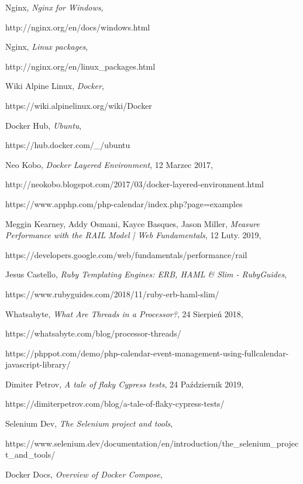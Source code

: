 \begin{thebibliography}{99}
Nginx,
\textit{Nginx for Windows},

http://nginx.org/en/docs/windows.html

Nginx, 
\textit{Linux packages},

http://nginx.org/en/linux\_packages.html

Wiki Alpine Linux, 
\textit{Docker},

https://wiki.alpinelinux.org/wiki/Docker

Docker Hub,
\textit{Ubuntu},

https://hub.docker.com/\_/ubuntu

Neo Kobo,
\textit{Docker Layered Environment},
12 Marzec 2017,

http://neokobo.blogspot.com/2017/03/docker-layered-environment.html

https://www.apphp.com/php-calendar/index.php?page=examples

Meggin Kearney, Addy Osmani, Kayce Basques, Jason Miller,
\textit{Measure Performance with the RAIL Model | Web Fundamentals},
12 Luty. 2019,

https://developers.google.com/web/fundamentals/performance/rail

Jesus Castello, 
\textit{Ruby Templating Engines: ERB, HAML \& Slim - RubyGuides},

https://www.rubyguides.com/2018/11/ruby-erb-haml-slim/

Whatsabyte,
\textit{What Are Threads in a Processor?},
24 Sierpień 2018,

https://whatsabyte.com/blog/processor-threads/

https://phppot.com/demo/php-calendar-event-management-using-fullcalendar-javascript-library/

Dimiter Petrov,
\textit{A tale of flaky Cypress tests},
24 Październik 2019,

https://dimiterpetrov.com/blog/a-tale-of-flaky-cypress-tests/

Selenium Dev,
\textit{The Selenium project and tools},

https://www.selenium.dev/documentation/en/introduction/the\_selenium\_project\_and\_tools/

Docker Docs,
\textit{Overview of Docker Compose},


\end{thebibliography}
